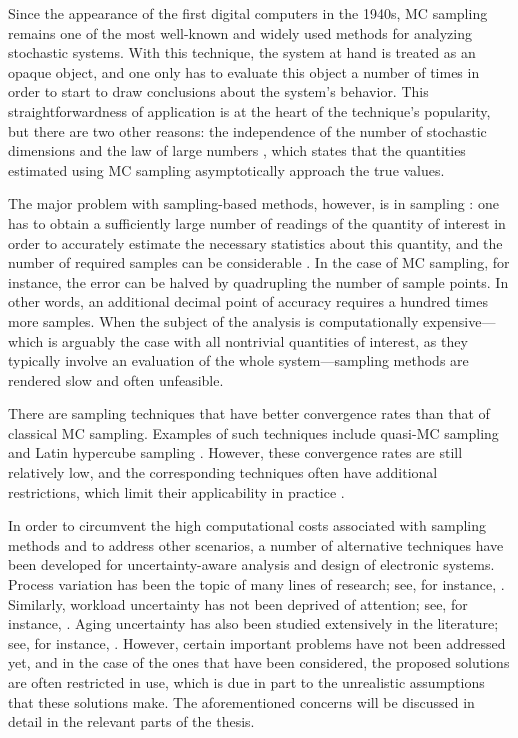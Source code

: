 Since the appearance of the first digital computers in the 1940s, \ac{MC}
sampling remains one of the most well-known and widely used methods for
analyzing stochastic systems. With this technique, the system at hand is treated
as an opaque object, and one only has to evaluate this object a number of times
in order to start to draw conclusions about the system's behavior. This
straightforwardness of application is at the heart of the technique's
popularity, but there are two other reasons: the independence of the number of
stochastic dimensions and the law of large numbers \cite{durrett2010}, which
states that the quantities estimated using \ac{MC} sampling asymptotically
approach the true values.

The major problem with sampling-based methods, however, is in sampling \perse:
one has to obtain a sufficiently large number of readings of the quantity of
interest in order to accurately estimate the necessary statistics about this
quantity, and the number of required samples can be considerable
\cite{diaz-emparanza2002}. In the case of \ac{MC} sampling, for instance, the
error can be halved by quadrupling the number of sample points. In other words,
an additional decimal point of accuracy requires a hundred times more samples.
When the subject of the analysis is computationally expensive---which is
arguably the case with all nontrivial quantities of interest, as they typically
involve an evaluation of the whole system---sampling methods are rendered slow
and often unfeasible.

There are sampling techniques that have better convergence rates than that of
classical \ac{MC} sampling. Examples of such techniques include quasi-\ac{MC}
sampling and Latin hypercube sampling \cite{asmussen2007, joe2008}. However,
these convergence rates are still relatively low, and the corresponding
techniques often have additional restrictions, which limit their applicability
in practice \cite{xiu2010}.

In order to circumvent the high computational costs associated with sampling
methods and to address other scenarios, a number of alternative techniques have
been developed for uncertainty-aware analysis and design of electronic systems.
Process variation has been the topic of many lines of research; see, for
instance, \cite{bhardwaj2006, vrudhula2006, bhardwaj2008, chandra2010, juan2012,
lee2013}. Similarly, workload uncertainty has not been deprived of attention;
see, for instance, \cite{diaz2002, zhu2008, schranzhofer2009, santinelli2011,
quinton2012, tanasa2015}. Aging uncertainty has also been studied extensively in
the literature; see, for instance, \cite{coskun2006, huang2009b, oboril2012,
firouzi2013, kiamehr2013, das2014c}. However, certain important problems have
not been addressed yet, and in the case of the ones that have been considered,
the proposed solutions are often restricted in use, which is due in part to the
unrealistic assumptions that these solutions make. The aforementioned concerns
will be discussed in detail in the relevant parts of the thesis.
